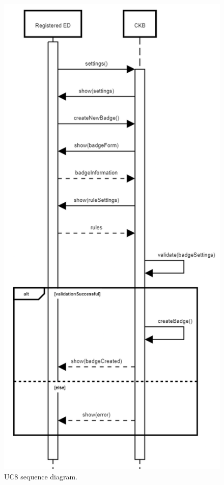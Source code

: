 \begin{center}
  \begin{figure} [H]
    \begin{center}
        \includegraphics[width=\textwidth,height=\textheight,keepaspectratio]{Images/UseCaseDiagrams/UC8.png}
        \caption{UC8 sequence diagram.}
        \label{fig: UC8_sequence_diagram}
    \end{center}
  \end{figure}
\end{center}

